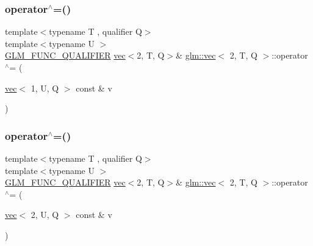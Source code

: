 \mbox{\label{structglm_1_1vec_3_012_00_01_t_00_01_q_01_4_a430b0e95cce94009cb9822a7b8a08f89}} 
\subsubsection{\texorpdfstring{operator$^\wedge$=()}{operator^=()}\hspace{0.1cm}{\footnotesize\ttfamily [5/6]}}
{\footnotesize\ttfamily template$<$typename T , qualifier Q$>$ \\
template$<$typename U $>$ \\
\hyperlink{setup_8hpp_a33fdea6f91c5f834105f7415e2a64407}{G\+L\+M\+\_\+\+F\+U\+N\+C\+\_\+\+Q\+U\+A\+L\+I\+F\+I\+ER} \hyperlink{structglm_1_1vec}{vec}$<$2, T, Q$>$\& \hyperlink{structglm_1_1vec}{glm\+::vec}$<$ 2, T, Q $>$\+::operator$^\wedge$= (\begin{DoxyParamCaption}\item[{\hyperlink{structglm_1_1vec}{vec}$<$ 1, U, Q $>$ const \&}]{v }\end{DoxyParamCaption})}

\mbox{\label{structglm_1_1vec_3_012_00_01_t_00_01_q_01_4_afed5270119c717c84024b98edb08e265}} 
\subsubsection{\texorpdfstring{operator$^\wedge$=()}{operator^=()}\hspace{0.1cm}{\footnotesize\ttfamily [6/6]}}
{\footnotesize\ttfamily template$<$typename T , qualifier Q$>$ \\
template$<$typename U $>$ \\
\hyperlink{setup_8hpp_a33fdea6f91c5f834105f7415e2a64407}{G\+L\+M\+\_\+\+F\+U\+N\+C\+\_\+\+Q\+U\+A\+L\+I\+F\+I\+ER} \hyperlink{structglm_1_1vec}{vec}$<$2, T, Q$>$\& \hyperlink{structglm_1_1vec}{glm\+::vec}$<$ 2, T, Q $>$\+::operator$^\wedge$= (\begin{DoxyParamCaption}\item[{\hyperlink{structglm_1_1vec}{vec}$<$ 2, U, Q $>$ const \&}]{v }\end{DoxyParamCaption})}


